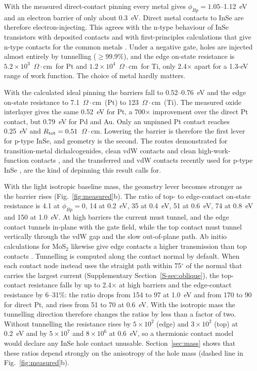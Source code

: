 \documentclass[11pt]{article}
\providecommand{\ohmcm}{\ensuremath{\Omega\cdot\mathrm{cm}}}
\providecommand{\ohmcm}{\ensuremath{\Omega\cdot\mathrm{cm}}}
\begin{document}
With the measured direct-contact pinning every metal gives $\phi_{Bp}=1.05$--1.12~eV and an electron barrier of only about 0.3~eV. Direct metal contacts to InSe are therefore electron-injecting. This agrees with the n-type behaviour of InSe transistors with deposited contacts \cite{reffeng14,refsuch,refhuang} and with first-principles calculations that give n-type contacts for the common metals \cite{refshi}. Under a negative gate, holes are injected almost entirely by tunnelling ($\geq$99.9\%), and the edge on-state resistance is $5.2\times10^3$~\ohmcm\ for Pt and $1.2\times10^4$~\ohmcm\ for Ti, only 2.4$\times$ apart for a 1.3-eV range of work function. The choice of metal hardly matters.

With the calculated ideal pinning the barriers fall to 0.52--0.76~eV and the edge on-state resistance to 7.1~\ohmcm\ (Pt) to 123~\ohmcm\ (Ti). The measured oxide interlayer gives the same 0.52~eV for Pt, a 700$\times$ improvement over the direct Pt contact, but 0.79~eV for Pd and Au. Only an unpinned Pt contact reaches 0.25~eV and $R_{\rm tot}=0.51$~\ohmcm. Lowering the barrier is therefore the first lever for p-type InSe, and geometry is the second. The routes demonstrated for transition-metal dichalcogenides, clean vdW contacts \cite{refliu18,refwangy19} and clean high-work-function contacts \cite{refwangy22}, and the transferred and vdW contacts recently used for p-type InSe \cite{refhu,refwei,refkim24}, are the kind of depinning this result calls for.

With the light isotropic baseline mass, the geometry lever becomes stronger as the barrier rises (Fig.~\ref{fig:measured}b). The ratio of top- to edge-contact on-state resistance is 4.1 at $\phi_{Bp}=0$, 14 at 0.2~eV, 35 at 0.4~eV, 51 at 0.6~eV, 74 at 0.8~eV and 150 at 1.0~eV. At high barriers the current must tunnel, and the edge contact tunnels in-plane with the gate field, while the top contact must tunnel vertically through the vdW gap and the slow out-of-plane path. Ab initio calculations for MoS$_2$ likewise give edge contacts a higher transmission than top contacts \cite{refszabo,refparto}. Tunnelling is computed along the contact normal by default. When each contact node instead uses the straight path within 75$^\circ$ of the normal that carries the largest current (Supplementary Section~\ref{S-sec:oblique}), the top-contact resistance falls by up to 2.4$\times$ at high barriers and the edge-contact resistance by 6--31\%: the ratio drops from 154 to 97 at 1.0~eV and from 170 to 90 for direct Pt, and rises from 51 to 70 at 0.6~eV. With the isotropic mass the tunnelling direction therefore changes the ratios by less than a factor of two. Without tunnelling the resistance rises by $5\times10^2$ (edge) and $3\times10^2$ (top) at 0.2~eV and by $5\times10^7$ and $8\times10^6$ at 0.6~eV, so a thermionic contact model would declare any InSe hole contact unusable. Section~\ref{sec:mass} shows that these ratios depend strongly on the anisotropy of the hole mass (dashed line in Fig.~\ref{fig:measured}b).
\end{document}
